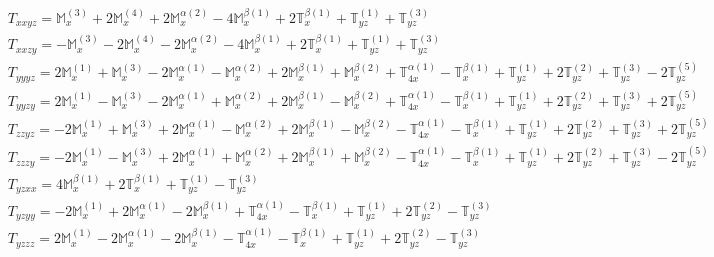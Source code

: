 \documentclass[fleqn,8pt,landscape]{jsarticle}
\begin{document}
\begin{align*}
& T_{xxyz} = \mathbb{M}_{x}^{(3)} + 2 \mathbb{M}_{x}^{(4)} + 2 \mathbb{M}_{x}^{\alpha(2)} - 4 \mathbb{M}_{x}^{\beta(1)} + 2 \mathbb{T}_{x}^{\beta(1)} + \mathbb{T}_{yz}^{(1)} + \mathbb{T}_{yz}^{(3)} \\
& T_{xxzy} = - \mathbb{M}_{x}^{(3)} - 2 \mathbb{M}_{x}^{(4)} - 2 \mathbb{M}_{x}^{\alpha(2)} - 4 \mathbb{M}_{x}^{\beta(1)} + 2 \mathbb{T}_{x}^{\beta(1)} + \mathbb{T}_{yz}^{(1)} + \mathbb{T}_{yz}^{(3)} \\
& T_{yyyz} = 2 \mathbb{M}_{x}^{(1)} + \mathbb{M}_{x}^{(3)} - 2 \mathbb{M}_{x}^{\alpha(1)} - \mathbb{M}_{x}^{\alpha(2)} + 2 \mathbb{M}_{x}^{\beta(1)} + \mathbb{M}_{x}^{\beta(2)} + \mathbb{T}_{4x}^{\alpha(1)} - \mathbb{T}_{x}^{\beta(1)} + \mathbb{T}_{yz}^{(1)} + 2 \mathbb{T}_{yz}^{(2)} + \mathbb{T}_{yz}^{(3)} - 2 \mathbb{T}_{yz}^{(5)} \\
& T_{yyzy} = 2 \mathbb{M}_{x}^{(1)} - \mathbb{M}_{x}^{(3)} - 2 \mathbb{M}_{x}^{\alpha(1)} + \mathbb{M}_{x}^{\alpha(2)} + 2 \mathbb{M}_{x}^{\beta(1)} - \mathbb{M}_{x}^{\beta(2)} + \mathbb{T}_{4x}^{\alpha(1)} - \mathbb{T}_{x}^{\beta(1)} + \mathbb{T}_{yz}^{(1)} + 2 \mathbb{T}_{yz}^{(2)} + \mathbb{T}_{yz}^{(3)} + 2 \mathbb{T}_{yz}^{(5)} \\
& T_{zzyz} = - 2 \mathbb{M}_{x}^{(1)} + \mathbb{M}_{x}^{(3)} + 2 \mathbb{M}_{x}^{\alpha(1)} - \mathbb{M}_{x}^{\alpha(2)} + 2 \mathbb{M}_{x}^{\beta(1)} - \mathbb{M}_{x}^{\beta(2)} - \mathbb{T}_{4x}^{\alpha(1)} - \mathbb{T}_{x}^{\beta(1)} + \mathbb{T}_{yz}^{(1)} + 2 \mathbb{T}_{yz}^{(2)} + \mathbb{T}_{yz}^{(3)} + 2 \mathbb{T}_{yz}^{(5)} \\
& T_{zzzy} = - 2 \mathbb{M}_{x}^{(1)} - \mathbb{M}_{x}^{(3)} + 2 \mathbb{M}_{x}^{\alpha(1)} + \mathbb{M}_{x}^{\alpha(2)} + 2 \mathbb{M}_{x}^{\beta(1)} + \mathbb{M}_{x}^{\beta(2)} - \mathbb{T}_{4x}^{\alpha(1)} - \mathbb{T}_{x}^{\beta(1)} + \mathbb{T}_{yz}^{(1)} + 2 \mathbb{T}_{yz}^{(2)} + \mathbb{T}_{yz}^{(3)} - 2 \mathbb{T}_{yz}^{(5)} \\
& T_{yzxx} = 4 \mathbb{M}_{x}^{\beta(1)} + 2 \mathbb{T}_{x}^{\beta(1)} + \mathbb{T}_{yz}^{(1)} - \mathbb{T}_{yz}^{(3)} \\
& T_{yzyy} = - 2 \mathbb{M}_{x}^{(1)} + 2 \mathbb{M}_{x}^{\alpha(1)} - 2 \mathbb{M}_{x}^{\beta(1)} + \mathbb{T}_{4x}^{\alpha(1)} - \mathbb{T}_{x}^{\beta(1)} + \mathbb{T}_{yz}^{(1)} + 2 \mathbb{T}_{yz}^{(2)} - \mathbb{T}_{yz}^{(3)} \\
& T_{yzzz} = 2 \mathbb{M}_{x}^{(1)} - 2 \mathbb{M}_{x}^{\alpha(1)} - 2 \mathbb{M}_{x}^{\beta(1)} - \mathbb{T}_{4x}^{\alpha(1)} - \mathbb{T}_{x}^{\beta(1)} + \mathbb{T}_{yz}^{(1)} + 2 \mathbb{T}_{yz}^{(2)} - \mathbb{T}_{yz}^{(3)} \\

\end{align*}
\end{document}
